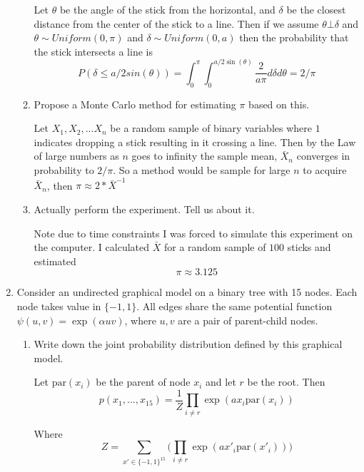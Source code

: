 \documentclass{article}
\begin{document}
\begin{enumerate}
\begin{enumerate}
\color{blue}
Let $\theta$ be the angle of the stick from the horizontal, and $\delta$ be the closest distance from the center of the stick to a line. Then
if we assume $\theta \bot \delta$ and $\theta \sim Uniform(0,\pi) $ and $\delta \sim Uniform(0,a)$ then the probability that the stick intersects a line is
$$
P(\delta \leq a /2 sin(\theta)) = \int_0^\pi \int_0^{a/2\sin(\theta)} \frac{2}{a\pi} d \delta d\theta = 2/\pi
$$

\color{black}

\item Propose a Monte Carlo method for estimating $\pi$ based on this. 

\color{blue}
Let $X_1, X_2 , ... X_n$ be a random sample of binary variables where $1$ indicates dropping a stick resulting in it crossing a line. Then by the Law of large numbers as $n$ goes to infinity the sample mean, $\bar{X}_n$ converges in probability to $2/\pi$. So a method would be sample for large $n$ to acquire $\bar{X}_n$, 
then $\pi \approx 2 * \bar{X}^{-1} $
\color{black}

\item Actually perform the experiment.  Tell us about it.

\color{blue}
Note due to time constraints I was forced to simulate this experiment on the computer. I calculated $\bar{X}$ for a random sample of $100$ sticks and estimated 
$$
\pi \approx 3.125
$$

\color{black}


\end{enumerate}

\item 
Consider an undirected graphical model on a binary tree with 15 nodes.
Each node takes value in $\{-1,1\}$.
All edges share the same potential function $\psi(u,v) = \exp(\alpha u v)$, where $u,v$ are a pair of parent-child nodes.

  \begin{enumerate}
  \item Write down the joint probability distribution defined by this graphical model.

\color{blue}
Let $\text{par}(x_i)$ be the parent of node $x_i$ and let $r$ be the root.
Then
$$
p(x_1,..., x_{15}) 
= \frac{1}{Z} \prod_{i \neq r} 
\exp (a x_i \text{par}(x_i)) 
$$

Where 
$$
Z = \sum_{x' \in \{-1,1\}^{15}} \bigg(\prod_{i \neq r} 
\exp (a x'_i \text{par}(x'_i)) \bigg)
$$

\color{black}  
  

\end{enumerate}
\end{enumerate}
\end{document}
